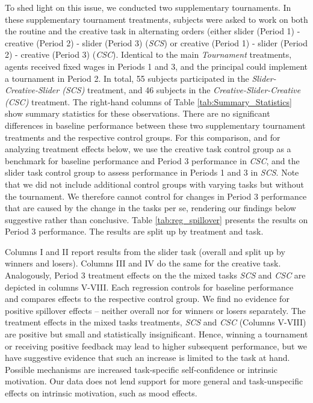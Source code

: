 To shed light on this issue, we conducted two 
supplementary tournaments. In these supplementary tournament treatments, subjects were asked to 
work on both the routine and the creative task in alternating orders (either 
slider (Period 1) - creative (Period 2) - slider (Period 3) (\textit{SCS}) or 
creative (Period 1) - slider (Period 2) - creative (Period 3) (\textit{CSC}). 
Identical to the main \textit{Tournament} treatments,
agents received fixed wages in Periods 1 and 3, and the principal could
implement a tournament in Period 2. In total, 55 subjects participated in the
\textit{ Slider-Creative-Slider (SCS)} treatment, and 46 subjects
 in the \textit{ Creative-Slider-Creative (CSC)} treatment.
The right-hand  columns of Table \ref{tab:Summary_Statistics} show
summary statistics for these observations. There are no significant differences in
baseline performance between these two  supplementary tournament treatments
and the respective control groups. For this comparison, and for analyzing treatment effects below,
we use the creative task control group as a benchmark for
baseline performance and  Period 3 performance in \textit{CSC},
and the slider task control group to assess
performance in Periods 1 and 3 in \textit{SCS}. Note that we did not include
additional control groups with varying tasks but without the tournament.
We therefore cannot control for changes in Period 3 performance
that are caused by the change in the tasks per se, rendering our findings below suggestive
rather than conclusive. Table \ref{tab:reg_spillover} presents the results on Period 3 performance.
The results are split up by treatment and task.

Columns I and II report results from the slider task (overall and split up by winners and losers).
Columns III and IV do the same for the creative task. Analogously, Period 3 treatment effects on the
the mixed tasks \textit{SCS} and \textit{CSC} are depicted in columns V-VIII.
Each regression controls for baseline performance and compares effects to the respective control group.
We find no evidence for positive spillover effects -- neither overall nor for winners or losers separately.
The treatment effects in the mixed tasks treatments, \textit{SCS} and \textit{CSC} (Columns V-VIII) are positive
but small and statistically insignificant. Hence,  winning  a tournament or receiving positive feedback
may lead to higher subsequent performance, but we have suggestive evidence that such an increase is limited to the task at hand. Possible
mechanisms are increased task-specific self-confidence or intrinsic motivation. Our data does not lend
support for more general and task-unspecific effects on intrinsic motivation, such as mood effects.

